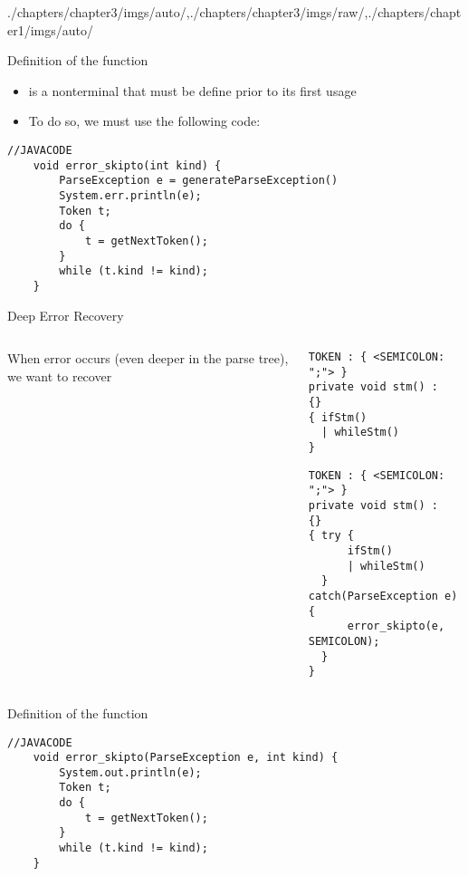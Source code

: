 \begin{graphicspathcontext}{{./chapters/chapter3/imgs/auto/},{./chapters/chapter3/imgs/raw/},{./chapters/chapter1/imgs/auto/}}
\begin{bibunit}[apalike]
\begin{frame}[fragile]{Definition of the function }
	\begin{itemize}
	\item {} is a nonterminal that must be define prior to its first usage
	\item To do so, we must use the following code:
	\end{itemize}
	\begin{lstlisting}[style=lststyle-java]
	//JAVACODE
	void error_skipto(int kind) {
	    ParseException e = generateParseException()
	    System.err.println(e);
	    Token t;
	    do {
	        t = getNextToken();
	    }
	    while (t.kind != kind);
	}
	\end{lstlisting}
\end{frame}

\begin{frame}[t,fragile]{Deep Error Recovery}
	\begin{columns}
		\begin{column}{.3\linewidth}
			When error occurs (even deeper in the parse tree), we want to recover
		\end{column}
		\begin{column}{.7\linewidth}
			\vspace{-.5cm}
			\begin{lstlisting}[style=lststyle-java]
TOKEN : { <SEMICOLON: ";"> }
private void stm() :
{}
{ ifStm()
  | whileStm()
}
			\end{lstlisting}
			\mbox{}\hfill{}\hfill\mbox{}
			\begin{lstlisting}[style=lststyle-java]
TOKEN : { <SEMICOLON: ";"> }
private void stm() :
{}
{ try {
      ifStm()
      | whileStm()
  } catch(ParseException e) {
      error_skipto(e, SEMICOLON);
  }
}
			\end{lstlisting}
		\end{column}
	\end{columns}
\end{frame}

\begin{frame}[fragile]{Definition of the function }
	\begin{lstlisting}[style=lststyle-java]
	//JAVACODE
	void error_skipto(ParseException e, int kind) {
	    System.out.println(e);
	    Token t;
	    do {
	        t = getNextToken();
	    }
	    while (t.kind != kind);
	}
	\end{lstlisting}
\end{frame}


\end{bibunit}
\end{graphicspathcontext}
